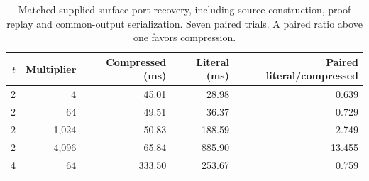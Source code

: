 \begin{table}[htbp]
\centering
\small
\begin{tabular}{@{}rrrrr@{}}
\toprule
$t$ & Multiplier & Compressed (ms) & Literal (ms) & Paired literal/compressed\\
\midrule
2 & 4 & 45.01 & 28.98 & 0.639\\
2 & 64 & 49.51 & 36.37 & 0.729\\
2 & 1,024 & 50.83 & 188.59 & 2.749\\
2 & 4,096 & 65.84 & 885.90 & 13.455\\
4 & 64 & 333.50 & 253.67 & 0.759\\
\bottomrule
\end{tabular}
\caption{Matched supplied-surface port recovery, including source construction, proof replay and common-output serialization. Seven paired trials. A paired ratio above one favors compression.}
\label{tab:geometry-timing}
\end{table}
